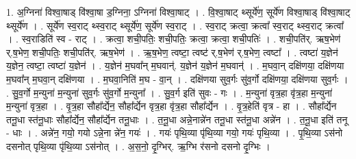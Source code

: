 \documentclass[17pt]{extarticle}
\begin{document}
1. अ॒ग्निना॑ विश्वा॒षाड् वि॑श्वा॒षा ड॒ग्निना॒ ऽग्निना॑ विश्वा॒षाट् । . वि॒श्वा॒षाट् थ्सूर्ये॑ण॒ सूर्ये॑ण विश्वा॒षाड् वि॑श्वा॒षाट् थ्सूर्ये॑ण । . सूर्ये॑ण स्व॒राट् थ्स्व॒राट् थ्सूर्ये॑ण॒ सूर्ये॑ण स्व॒राट् । . स्व॒राट् क्रत्वा॒ क्रत्वा᳚ स्व॒राट् थ्स्व॒राट् क्रत्वा᳚ । . स्व॒राडिति॑ स्व - राट् । . क्रत्वा॒ शची॒पतिः॒ शची॒पतिः॒ क्रत्वा॒ क्रत्वा॒ शची॒पतिः॑ । . शची॒पति॑र्. ऋष॒भेण॑ र्.ष॒भेण॒ शची॒पतिः॒ शची॒पति॑र्. ऋष॒भेण॑ । . ऋ॒ष॒भेण॒ त्वष्टा॒ त्वष्ट॑ र्.ष॒भेण॑ र्.ष॒भेण॒ त्वष्टा᳚ । . त्वष्टा॑ य॒ज्ञेन॑ य॒ज्ञेन॒ त्वष्टा॒ त्वष्टा॑ य॒ज्ञेन॑ । . य॒ज्ञेन॑ म॒घवा᳚न् म॒घवान्॑. य॒ज्ञेन॑ य॒ज्ञेन॑ म॒घवान्॑ । . म॒घवा॒न् दक्षि॑णया॒ दक्षि॑णया म॒घवा᳚न् म॒घवा॒न् दक्षि॑णया । . म॒घवा॒निति॑ म॒घ - वा॒न् । . दक्षि॑णया सुव॒र्गः सु॑व॒र्गो दक्षि॑णया॒ दक्षि॑णया सुव॒र्गः । . सु॒व॒र्गो म॒न्युना॑ म॒न्युना॑ सुव॒र्गः सु॑व॒र्गो म॒न्युना᳚ । . सु॒व॒र्ग इति॑ सुवः - गः । . म॒न्युना॑ वृत्र॒हा वृ॑त्र॒हा म॒न्युना॑ म॒न्युना॑ वृत्र॒हा । . वृ॒त्र॒हा सौहा᳚र्द्येन॒ सौहा᳚र्द्येन वृत्र॒हा वृ॑त्र॒हा सौहा᳚र्द्येन । . वृ॒त्र॒हेति॑ वृत्र - हा । . सौहा᳚र्द्येन तनू॒धा स्त॑नू॒धाः सौहा᳚र्द्येन॒ सौहा᳚र्द्येन तनू॒धाः । . त॒नू॒धा अन्ने॒नान्ने॑न तनू॒धा स्त॑नू॒धा अन्ने॑न । . त॒नू॒धा इति॑ तनू - धाः । . अन्ने॑न॒ गयो॒ गयो ऽन्ने॒ना न्ने॑न॒ गयः॑ । . गयः॑ पृथि॒व्या पृ॑थि॒व्या गयो॒ गयः॑ पृथि॒व्या । . पृ॒थि॒व्या ऽस॑नो दसनोत् पृथि॒व्या पृ॑थि॒व्या ऽस॑नोत् । . अ॒स॒नो॒ दृ॒ग्भिर्. ऋ॒ग्भि र॑सनो दसनो दृ॒ग्भिः । \newline
\end{document}

